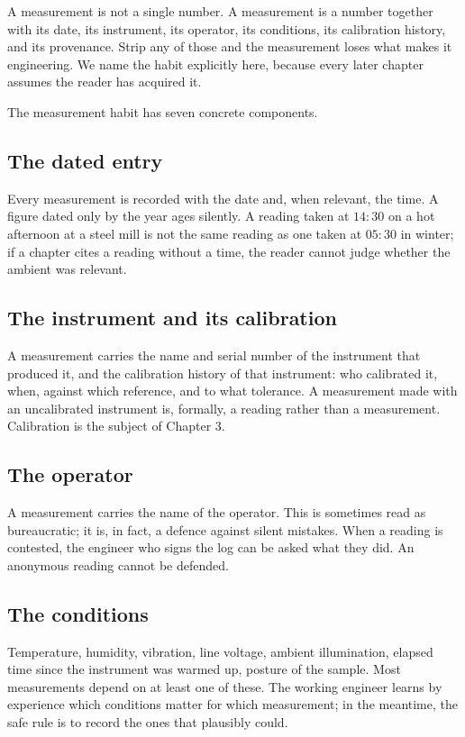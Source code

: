 A measurement is not a single number. A measurement is a number
together with its date, its instrument, its operator, its conditions,
its calibration history, and its provenance. Strip any of those and
the measurement loses what makes it engineering. We name the habit
explicitly here, because every later chapter assumes the reader has
acquired it.

The measurement habit has seven concrete components.

\subsection{The dated entry}

Every measurement is recorded with the date and, when relevant, the
time. A figure dated only by the year ages silently. A reading taken
at $14{:}30$ on a hot afternoon at a steel mill is not the same
reading as one taken at $05{:}30$ in winter; if a chapter cites a
reading without a time, the reader cannot judge whether the
ambient was relevant.

\subsection{The instrument and its calibration}

A measurement carries the name and serial number of the instrument
that produced it, and the calibration history of that instrument: who
calibrated it, when, against which reference, and to what tolerance.
A measurement made with an uncalibrated instrument is, formally, a
reading rather than a measurement. Calibration is the subject of
Chapter 3.

\subsection{The operator}

A measurement carries the name of the operator. This is sometimes
read as bureaucratic; it is, in fact, a defence against silent
mistakes. When a reading is contested, the engineer who signs the
log can be asked what they did. An anonymous reading cannot be
defended.

\subsection{The conditions}

Temperature, humidity, vibration, line voltage, ambient illumination,
elapsed time since the instrument was warmed up, posture of the
sample. Most measurements depend on at least one of these. The
working engineer learns by experience which conditions matter for
which measurement; in the meantime, the safe rule is to record the
ones that plausibly could.

